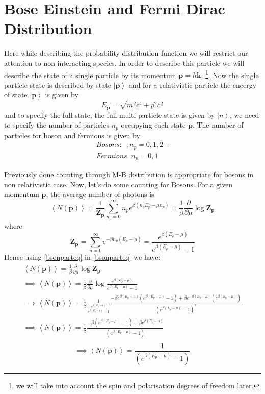 \documentclass[12pt]{report}
\newcommand{\mbf}[1]{\mathbf{#1}}
\newcommand{\fn}[1]{\footnote{#1}}
\newcommand{\p}{\partial}
\newcommand{\ket}[1]{\ensuremath{\left|#1\right\rangle}}
\begin{document}
\section{Bose Einstein and Fermi Dirac Distribution }

Here while describing the probability distribution function we will restrict our attention to non interacting species. In order to describe this particle we will describe the state of a single particle by its momentum $\mbf{p=\hbar k}$. \fn{we will take into account the spin and polarisation degrees of freedom later.}. Now the single particle state is described by state \ket{\mbf{p}} and for a relativistic particle the eneergy of state \ket{\mbf{p}} is given by
\begin{equation}
E_{\mbf{p}}= \sqrt{m^2c^4+p^2c^2}
\end{equation} 
and to specify the full state, the full multi particle state is given by  \ket{n}, we need to specify the number of particles $n_p$ occupying each state $\mbf{p}$. The number of particles for boson and fermions is given by
\begin{eqnarray*}
Bosons: \; \ ; n_p=0,1,2 \cdots\\
Fermions \; \; n_p=0,1
\end{eqnarray*}

Previously done counting through M-B distribution is appropriate for bosons in non relativistic case.  Now, let's do some counting for Bosons. For a given momentum $\mbf{p}$, the average number of photons is 
\begin{equation}\label{countingbsoneq}
\left\langle N(\mbf{p}) \right\rangle = \frac{1}{\mbf{Z_p}}\sum^{\infty}_{n_p=0}n_pe^{\beta(n_pE_p-\mu n_p)}=\frac{1}{\beta}\frac{\p}{\p \mu} \log \mbf{Z_p}
\end{equation}
where
\begin{equation}\label{bsonparteq}
\mbf{Z_p}=\sum^\infty_{n=0}e^{-\beta n_p(E_p-\mu)}=\frac{e^{\beta(E_p-\mu)}}{e^{\beta(E_p-\mu)} - 1}
\end{equation} 
Hence using \eqref{bsonparteq} in \eqref{bsonparteq} we have:
\begin{eqnarray*}
\left\langle N(\mbf{p}) \right\rangle =\frac{1}{\beta}\frac{\p}{\p \mu} \log \mbf{Z_p}\\
\implies \left\langle N(\mbf{p}) \right\rangle = \frac{1}{\beta}\frac{\p}{\p \mu} \log \frac{e^{\beta(E_p-\mu)}}{e^{\beta(E_p-\mu)} - 1}\\
\implies \left\langle N(\mbf{p}) \right\rangle = \frac{1}{\beta} \frac{1}{\frac{e^{\beta(E_p-\mu)}}{e^{\beta(E_p-\mu)} - 1}}\frac{- \beta e^{\beta(E_p-\mu)} (e^{\beta(E_p-\mu)} - 1) + \beta e^{-\beta(E_p-\mu)} (e^{\beta(E_p-\mu) })}{(e^{\beta(E_p-\mu)} - 1)^2}\\
\implies \left\langle N(\mbf{p}) \right\rangle = \frac{1}{\beta} \frac{-\beta  (e^{\beta(E_p-\mu)} - 1) + \beta e^{\beta(E_p-\mu)}}{(e^{\beta(E_p-\mu)} - 1)}\\
\end{eqnarray*}
\begin{equation}
\implies \left\langle N(\mbf{p}) \right\rangle =  \frac{    1}{(e^{\beta(E_p-\mu)} - 1)}
\end{equation}
\end{document}
